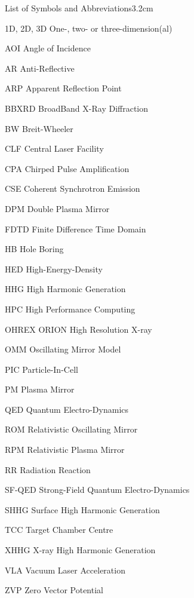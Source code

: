 \begin{mclistof}{List of Symbols and Abbreviations}{3.2cm}
\item[1D, 2D, 3D] One-, two- or three-dimension(al)
\item[AOI] Angle of Incidence
\item[AR] Anti-Reflective
\item[ARP] Apparent Reflection Point
\item[BBXRD] BroadBand X-Ray Diffraction
\item[BW] Breit-Wheeler
\item[CLF] Central Laser Facility
\item[CPA] Chirped Pulse Amplification
\item[CSE] Coherent Synchrotron Emission
\item[DPM] Double Plasma Mirror
\item[FDTD] Finite Difference Time Domain
\item[HB] Hole Boring
\item[HED] High-Energy-Density
\item[HHG] High Harmonic Generation
\item[HPC] High Performance Computing
\item[OHREX] ORION High Resolution X-ray
\item[OMM] Oscillating Mirror Model
\item[PIC] Particle-In-Cell
\item[PM] Plasma Mirror
\item[QED] Quantum Electro-Dynamics
\item[ROM] Relativistic Oscillating Mirror
\item[RPM] Relativistic Plasma Mirror
\item[RR] Radiation Reaction
\item[SF-QED] Strong-Field Quantum Electro-Dynamics
\item[SHHG] Surface High Harmonic Generation
\item[TCC] Target Chamber Centre
\item[XHHG] X-ray High Harmonic Generation
\item[VLA] Vacuum Laser Acceleration
\item[ZVP] Zero Vector Potential


\end{mclistof}
